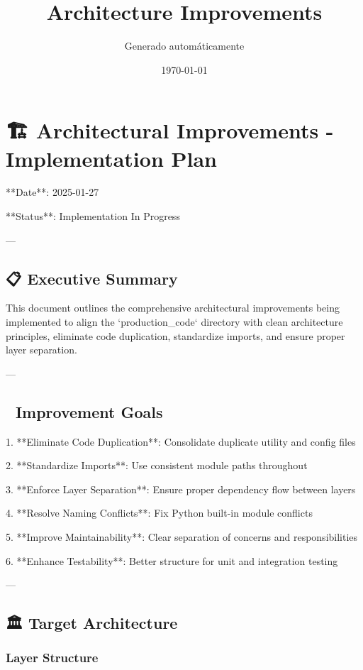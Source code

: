 \documentclass[11pt,a4paper]{article}
\title{Architecture Improvements}
\author{Generado automáticamente}
\date{\today}
\begin{document}
\maketitle

\tableofcontents
\newpage

\section{🏗️ Architectural Improvements - Implementation Plan}

**Date**: 2025-01-27  

**Status**: Implementation In Progress

---

\subsection{📋 Executive Summary}

This document outlines the comprehensive architectural improvements being implemented to align the `production\_code` directory with clean architecture principles, eliminate code duplication, standardize imports, and ensure proper layer separation.

---

\subsection{🎯 Improvement Goals}

1. **Eliminate Code Duplication**: Consolidate duplicate utility and config files

2. **Standardize Imports**: Use consistent module paths throughout

3. **Enforce Layer Separation**: Ensure proper dependency flow between layers

4. **Resolve Naming Conflicts**: Fix Python built-in module conflicts

5. **Improve Maintainability**: Clear separation of concerns and responsibilities

6. **Enhance Testability**: Better structure for unit and integration testing

---

\subsection{🏛️ Target Architecture}

\subsubsection{Layer Structure}
\end{document}
